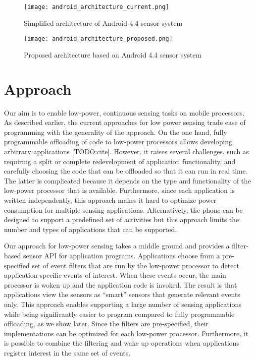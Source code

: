 
\begin{figure}[p]
	\texttt{[image: android\_architecture\_current.png]}
	\caption{Simplified architecture of Android 4.4 sensor system}
    \label{fig:androidArchCurrent}
\end{figure}

\begin{figure}[p]
	\texttt{[image: android\_architecture\_proposed.png]}
	\caption{Proposed architecture based on Android 4.4 sensor system}
    \label{fig:androidArchProposed}
\end{figure}


\section{Approach}
\label{sec:approach}

Our aim is to enable low-power, continuous sensing tasks on mobile processors.
As described earlier, the current approaches for low power sensing trade ease of
programming with the generality of the approach. On the one hand, fully
programmable offloading of code to low-power processors allows developing
arbitrary applications [TODO:cite]. However, it raises several challenges, such as
requiring a split or complete redevelopment of application functionality, and
carefully choosing the code that can be offloaded so that it can run in real
time. The latter is complicated because it depends on the type and functionality
of the low-power processor that is available. Furthermore, since each
application is written independently, this approach makes it hard to optimize
power consumption for multiple sensing applications. Alternatively, the phone
can be designed to support a predefined set of activities but this approach
limits the number and types of applications that can be supported.

Our approach for low-power sensing takes a middle ground and provides a
filter-based sensor API for application programs. Applications choose from a
pre-specified set of event filters that are run by the low-power processor to
detect application-specific events of interest. When these events occur, the
main processor is woken up and the application code is invoked. The result is
that applications view the sensors as ``smart'' sensors that generate relevant
events only. This approach enables supporting a large number of sensing
applications while being significantly easier to program compared to fully
programmable offloading, as we show later. Since the filters are pre-specified,
their implementations can be optimized for each low-power
processor. Furthermore, it is possible to combine the filtering and wake up
operations when applications register interest in the same set of events.

